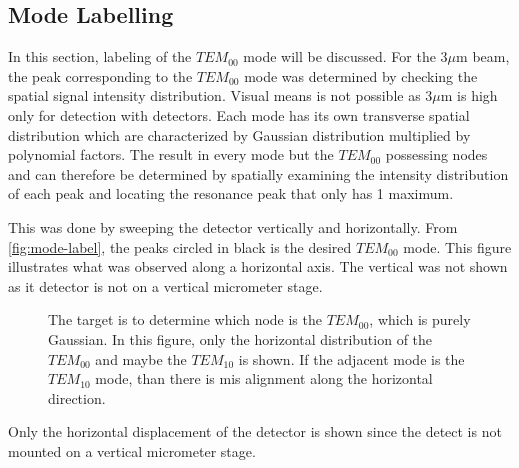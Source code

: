 \documentclass[11pt,a4paper]{book}
\newcommand{\imginput}[1]{} %
\begin{document}
		\subsection{Mode Labelling}
			\label{subsec:Mode Labelling}
			In this section, labeling of the $TEM_{00}$ mode will be discussed. For the 3$\mu$m beam, the peak corresponding to the $TEM_{00}$ mode was determined by checking the spatial signal intensity distribution. Visual means is not possible as 3$\mu$m is high only for detection with detectors. Each mode has its own transverse spatial distribution which are characterized by Gaussian distribution multiplied by polynomial factors. The result in every mode but the $TEM_{00}$ possessing nodes and can therefore be determined by spatially examining the intensity distribution of each peak and locating the resonance peak that only has 1 maximum. 
			
			This was done by sweeping the detector vertically and horizontally. From \autoref{fig:mode-label}, the peaks circled in black is the desired $TEM_{00}$ mode. This figure illustrates what was observed along a horizontal axis. The vertical was not shown as it detector is not on a vertical micrometer stage.
			
			\begin{figure} [!ht]
				\centering
				\def\svgwidth{\columnwidth}
				\resizebox{160mm}{!}{\imginput{images/mode-label.pdf_tex}}
				\caption{The target is to determine which node is the $TEM_{00}$, which is purely Gaussian. In this figure, only the horizontal distribution of the $TEM_{00}$ and maybe the $TEM_{10}$ is shown. If the adjacent mode is the $TEM_{10}$ mode, than there is mis alignment along the horizontal direction.}
				\label{fig:mode-label}
			\end{figure}
			
			Only the horizontal displacement of the detector is shown since the detect is not mounted on a vertical micrometer stage.						
						
		
\end{document}
